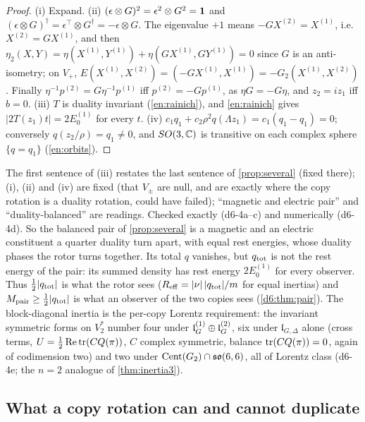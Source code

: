 \begin{proof}
(i) Expand. (ii) $(\epsilon\otimes G)^2=\epsilon^2\otimes G^2=\mathbf 1$ and $(\epsilon\otimes G)^\dagger=\epsilon^{\!\top}\otimes G^\dagger=-\epsilon\otimes G$.
The eigenvalue $+1$ means $-GX^{(2)}=X^{(1)}$, i.e.\ $X^{(2)}=GX^{(1)}$, and then
$\eta_2(X,Y)=\eta(X^{(1)},Y^{(1)})+\eta(GX^{(1)},GY^{(1)})=0$ since $G$ is an anti-isometry; on $V_+$,
$E(X^{(1)},X^{(2)})=(-GX^{(1)},X^{(1)})=-G_2(X^{(1)},X^{(2)})$. Finally $\eta^{-1}p^{(2)}=G\eta^{-1}p^{(1)}$ iff $p^{(2)}=-Gp^{(1)}$, as $\eta G=-G\eta$, and
$z_2=iz_1$ iff $b=0$. (iii) $T$ is duality invariant (\cref{en:rainich}), and \cref{en:rainich} gives $|2T(z_1)t|=2E_0^{(1)}$ for
every $t$. (iv) $c_1q_1+c_2\rho^2q(\Lambda z_1)=c_1(q_1-q_1)=0$; conversely $q(z_2/\rho)=q_1\neq0$, and $SO(3,\mathbb{C})$ is transitive on each complex
sphere $\{q=q_1\}$ (\cref{en:orbits}).
\end{proof}

The first sentence of (iii) restates the last sentence of \cref{prop:several} (fixed there); (i), (ii) and (iv) are fixed (that
$V_\pm$ are null, and are exactly where the copy rotation is a duality rotation, could have failed); ``magnetic and electric pair'' and
``duality-balanced'' are readings. Checked exactly (d6-4a--c) and numerically (d6-4d). So the balanced pair of \cref{prop:several} is
a magnetic and an electric constituent a quarter duality turn apart, with equal rest energies, whose duality phases the rotor turns together.
Its total $q$ vanishes, but $q_{\rm tot}$ is not the rest energy of the pair: its summed density has rest energy $2E_0^{(1)}$ for every
observer. Thus $\tfrac12|q_{\rm tot}|$ is what the rotor sees ($R_{\rm eff}=|\nu|\,|q_{\rm tot}|/m$ for equal inertias) and $M_{\rm pair}\ge\tfrac12|q_{\rm tot}|$ is
what an observer of the two copies sees (\cref{d6:thm:pair}). The block-diagonal inertia is the per-copy Lorentz requirement: the invariant
symmetric forms on $V_2^*$ number four under $\mathfrak l_G^{(1)}\oplus\mathfrak l_G^{(2)}$, six under $\mathfrak l_{G,\Delta}$ alone (cross terms,
$U=\tfrac12\operatorname{Re}\operatorname{tr}(CQ(\pi))$, $C$ complex symmetric, balance $\operatorname{tr}(CQ(\pi))=0$, again of codimension two) and two under $\operatorname{Cent}(G_2)\cap\mathfrak{so}(6,6)$, all of
Lorentz class (d6-4e; the $n=2$ analogue of \cref{thm:inertia3}).

\subsection{What a copy rotation can and cannot duplicate}
\label{d6:sec:covariant}

